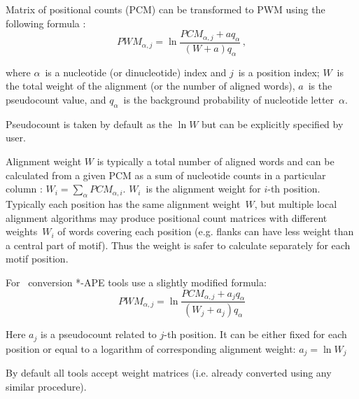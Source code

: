 Matrix of positional counts (PCM) can be transformed to PWM using the following formula \cite{Lifanov2003}:
\begin{equation}PWM_{\alpha,j} = \ln\frac{ PCM_{\alpha,j} + aq_{\alpha} }{ (W+a)q_{\alpha} }\,, \end{equation}

where $\alpha$~is a nucleotide (or dinucleotide) index and $j$~is a position index; $W$~is the total weight of the alignment (or the number of aligned words), $a$~is the
pseudocount value, and $q_{\alpha}$~is the background probability of nucleotide letter~$\alpha$.

Pseudocount is taken by default as the $\ln{W}$ but can be explicitly specified by user.

Alignment weight $W$ is typically a total number of aligned words and can be calculated from
 a given PCM as a sum of nucleotide counts in a particular column : $W_i = \sum_{\alpha}PCM_{\alpha,i}$.
 $W_i$~is the alignment weight for \mbox{$i$-th} position.
 Typically each position has the same alignment weight~$W$, but multiple local alignment algorithms may
 produce positional count matrices with different weights~$W_i$ of words covering each position
 (e.g. flanks can have less weight than a central part of motif). Thus the weight is safer to calculate separately for each motif position.

For \PcmToPwm\ conversion *-APE tools use a slightly modified formula:
\begin{equation}PWM_{\alpha,j} = \ln\frac{ PCM_{\alpha,j} + a_j q_{\alpha} }{ (W_j+a_j)q_{\alpha} }\end{equation}

Here $a_j$ is a pseudocount related to \mbox{$j$-th} position.
It can be either fixed for each position or equal to a logarithm of corresponding alignment weight: $a_j=\ln{W_j}$

By default all tools accept weight matrices (i.e. already converted using any similar procedure).
